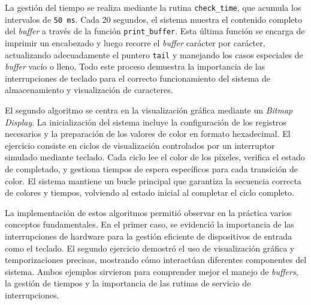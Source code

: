 \documentclass{article}
\begin{document}
La gestión del tiempo se realiza mediante la rutina \texttt{check\_time}, que acumula los intervalos de \texttt{50\,ms}. Cada 20 segundos, el sistema muestra el contenido completo del \textit{buffer} a través de la función \texttt{print\_buffer}. Esta última función se encarga de imprimir un encabezado y luego recorre el \textit{buffer} carácter por carácter, actualizando adecuadamente el puntero \texttt{tail} y manejando los casos especiales de \textit{buffer} vacío o lleno. Todo este proceso demuestra la importancia de las interrupciones de teclado para el correcto funcionamiento del sistema de almacenamiento y visualización de caracteres.

El segundo algoritmo se centra en la visualización gráfica mediante un \textit{Bitmap Display}. La inicialización del sistema incluye la configuración de los registros necesarios y la preparación de los valores de color en formato hexadecimal. El ejercicio consiste en ciclos de visualización controlados por un interruptor simulado mediante teclado. Cada ciclo lee el color de los píxeles, verifica el estado de completado, y gestiona tiempos de espera específicos para cada transición de color. El sistema mantiene un bucle principal que garantiza la secuencia correcta de colores y tiempos, volviendo al estado inicial al completar el ciclo completo.

La implementación de estos algoritmos permitió observar en la práctica varios conceptos fundamentales. En el primer caso, se evidenció la importancia de las interrupciones de hardware para la gestión eficiente de dispositivos de entrada como el teclado. El segundo ejercicio demostró el uso de visualización gráfica y temporizaciones precisas, mostrando cómo interactúan diferentes componentes del sistema. Ambos ejemplos sirvieron para comprender mejor el manejo de \textit{buffers}, la gestión de tiempos y la importancia de las rutinas de servicio de interrupciones.
\end{document}
